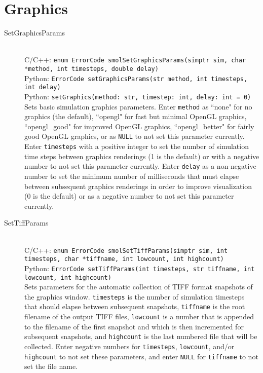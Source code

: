 \documentclass {scrbook}
\newcommand {\ttt} {\texttt}
\begin{document}
\section{Graphics}

\begin{description}

\item[SetGraphicsParams]
\hfill \\
C/C++: \ttt{enum ErrorCode smolSetGraphicsParams(simptr sim, char *method, int timesteps, double delay)}\\
Python: \ttt{ErrorCode setGraphicsParams(str method, int timesteps, int delay)}\\
Python: \ttt{setGraphics(method: str, timestep: int, delay: int = 0)}\\
Sets basic simulation graphics parameters. Enter \ttt{method} as ``none" for no graphics (the default), ``opengl" for fast but minimal OpenGL graphics, ``opengl\_good" for improved OpenGL graphics, ``opengl\_better" for fairly good OpenGL graphics, or as \ttt{NULL} to not set this parameter currently. Enter \ttt{timesteps} with a positive integer to set the number of simulation time steps between graphics renderings (1 is the default) or with a negative number to not set this parameter currently. Enter \ttt{delay} as a non-negative number to set the minimum number of milliseconds that must elapse between subsequent graphics renderings in order to improve visualization (0 is the default) or as a negative number to not set this parameter currently.

\item[SetTiffParams]
\hfill \\
C/C++: \ttt{enum ErrorCode smolSetTiffParams(simptr sim, int timesteps, char *tiffname, int lowcount, int highcount)}\\
Python: \ttt{ErrorCode setTiffParams(int timesteps, str tiffname, int lowcount, int highcount)}\\
Sets parameters for the automatic collection of TIFF format snapshots of the graphics window. \ttt{timesteps} is the number of simulation timesteps that should elapse between subsequent snapshots, \ttt{tiffname} is the root filename of the output TIFF files, \ttt{lowcount} is a number that is appended to the filename of the first snapshot and which is then incremented for subsequent snapshots, and \ttt{highcount} is the last numbered file that will be collected. Enter negative numbers for \ttt{timesteps}, \ttt{lowcount}, and/or \ttt{highcount} to not set these parameters, and enter \ttt{NULL} for \ttt{tiffname} to not set the file name.


\end{description}
\end{document}
